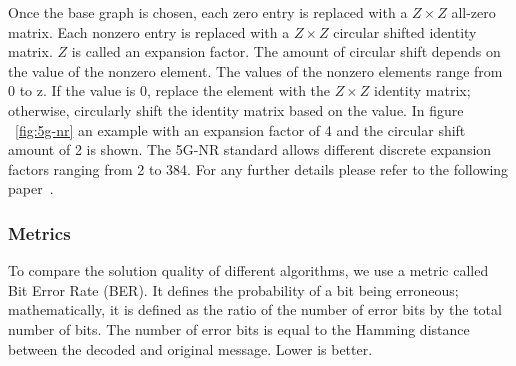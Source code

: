 Once the base graph is chosen, each zero entry is replaced with a $Z \times Z$ all-zero matrix. Each nonzero entry is replaced with a $Z \times Z $ circular shifted identity matrix. $Z$ is called an expansion factor. The amount of circular shift depends on the value of the nonzero element. The values of the nonzero elements range from 0 to z. If the value is 0, replace the element with the $Z \times Z$ identity matrix; otherwise, circularly shift the identity matrix based on the value. In figure ~\ref{fig:5g-nr} an example with an expansion factor of 4 and the circular shift amount of 2 is shown. The 5G-NR standard allows different discrete expansion factors ranging from 2 to 384. For any further details please refer to the following paper~\cite{bae2019overview}.

\subsubsection{Metrics}

To compare the solution quality of different algorithms, we use a metric called Bit Error Rate (BER). It defines the probability of a bit being erroneous; mathematically, it is defined as the ratio of the number of error bits by the total number of bits. The number of error bits is equal to the Hamming distance between the decoded and original message. Lower is better.







